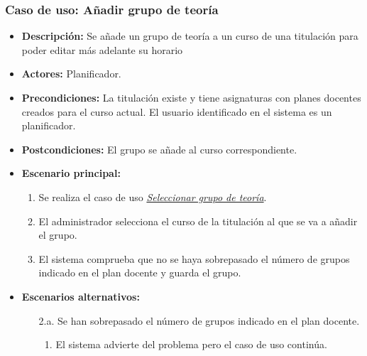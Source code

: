 


\subsubsection*{Caso de uso: Añadir grupo de teoría}
\begin{itemize}
\item{\bf Descripción:} Se añade un grupo de teoría a un curso de una titulación para poder editar más adelante su horario
\item{\bf Actores:} Planificador. 
\item{\bf Precondiciones:} La titulación existe y tiene asignaturas con planes docentes creados para el curso actual. El usuario identificado en el sistema es un planificador.
\item{\bf Postcondiciones:} El grupo se añade al curso correspondiente.
\item{\bf Escenario principal:}
	\begin{enumerate}
	\item Se realiza el caso de uso {\em \hyperref[select_grupo]{Seleccionar grupo de teoría}}.
	\item El administrador selecciona el curso de la titulación al que se va a añadir el grupo.
	\item El sistema comprueba que no se haya sobrepasado el número de grupos indicado en el plan docente y guarda el grupo.
	\end{enumerate}
\item{\bf Escenarios alternativos:}
	\begin{itemize}
		\item[2.a.] Se han sobrepasado el número de grupos indicado en el plan docente.
		\begin{enumerate}
			\item El sistema advierte del problema pero el caso de uso continúa.
		\end{enumerate}
	\end{itemize}
\end{itemize}



